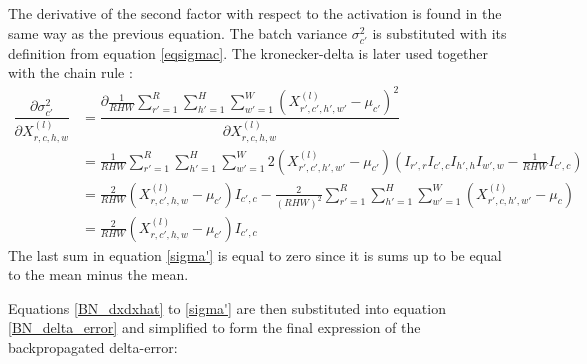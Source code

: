 \documentclass[a4paper, twoside]{article}
\newcommand*{\pd}[2]{\ensuremath{\dfrac{\partial #1}{\partial #2}}}
\begin{document}
The derivative of the second factor with respect to the activation is found in the same way as the previous equation. The batch variance $\sigma^2_{c'}$ is substituted with its definition from equation \eqref{eqsigmac}. The kronecker-delta is later used together with the chain rule \cite{webBN1} \cite{webBN2}:
\begin{equation}\label{sigma'}
\begin{split}
\pd{\sigma^2_{c'}}{{X}^{(l)}_{r,c,h,w}}
	& = \pd{\frac{1}{RHW} \sum\limits^{R }_{r'=1} \sum\limits^{H }_{h'=1} \sum\limits^{W }_{w'=1} ({X^{(l)}_{r',c',h',w'} - \mu_{c'}})^2}{{X}^{(l)}_{r,c,h,w}} \\
	& = \frac{1}{RHW} \sum\limits^{R }_{r'=1} \sum\limits^{H }_{h'=1} \sum\limits^{W }_{w'=1} 2 ({X^{(l)}_{r',c',h',w'} - \mu_{c'}}) (I_{r',r} I_{c',c} I_{h',h} I_{w',w} - \frac{1}{RHW} I_{c',c}) \\
	& = \frac{2}{RHW} ({X^{(l)}_{r,c',h,w} - \mu_{c'}})I_{c',c} - \frac{2}{(RHW)^2}  \sum\limits^{R }_{r'=1} \sum\limits^{H }_{h'=1} \sum\limits^{W }_{w'=1} ({X^{(l)}_{r',c,h',w'} - \mu_{c}}) \\
	& = \frac{2}{RHW} ({X^{(l)}_{r,c',h,w} - \mu_{c'}})I_{c',c}
\end{split}
\end{equation}
The last sum in equation \eqref{sigma'} is equal to zero since it is sums up to be equal to the mean minus the mean.

Equations \eqref{BN_dxdxhat} to \eqref{sigma'} are then substituted into equation \eqref{BN_delta_error} and simplified to form the final expression of the backpropagated delta-error:
\end{document}
